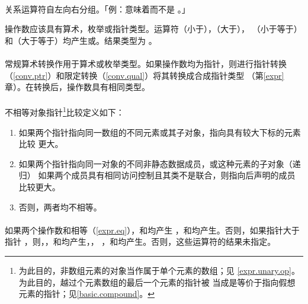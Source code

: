 \paragraph{}
关系运算符自左向右分组。「例：意味着而不是
。」


操作数应该具有算术，枚举或指针类型。运算符\tm{<}（小于），\tm{>}（大于），
\tm{<=}（小于等于）和\tm{>=}（大于等于）均产生或。结果类型为
。

\paragraph{}
常规算术转换作用于算术或枚举类型。如果操作数均为指针，则进行指针转换
（\ref{conv.ptr}）和限定转换（\ref{conv.qual}）将其转换成合成指针类型
（第\ref{expr}章）。在转换后，操作数具有相同类型。

\paragraph{}
不相等对象指针\footnote{为此目的，非数组元素的对象当作属于单个元素的数组；见
\ref{expr.unary.op}。为此目的，越过个元素数组的最后一个元素的指针被
当成是等价于指向假想元素的指针；见\ref{basic.compound}。}比较定义如下：
\begin{enumerate}
  \item{如果两个指针指向同一数组的不同元素或其子对象，指向具有较大下标的元素比较
    更大。}
  \item{如果两个指针指向同一对象的不同非静态数据成员，或这种元素的子对象（递归）
    如果两个成员具有相同访问控制且其类不是联合，则指向后声明的成员比较更大。}
  \item{否则，两者均不相等。}
\end{enumerate}

\paragraph{}
如果两个操作数和相等（\ref{expr.eq}），和均产生
，和均产生。否则，如果指针大于指针
，则，，和均产生，，
，和均产生。否则，这些运算符的结果未指定。

